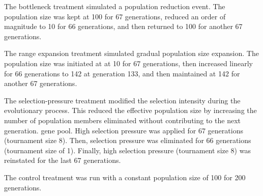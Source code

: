 The bottleneck treatment simulated a population reduction event.
The population size was kept at 100 for 67 generations, reduced an order of magnitude to 10 for 66 generations, and then returned to 100 for another 67 generations.

The range expansion treatment simulated gradual population size expansion.
The population size was initiated at at 10 for 67 generations, then increased linearly for 66 generations to 142 at generation 133, and then maintained at 142 for another 67 generations.

The selection-pressure treatment modified the selection intensity during the evolutionary process.
This reduced the effective population size by increasing the number of population members eliminated without contributing to the next generation. gene pool.
High selection pressure was applied for 67 generations (tournament size 8). Then, selection pressure was eliminated for 66 generations (tournament size of 1).
Finally, high selection pressure (tournament size 8) was reinstated for the last 67 generations.

The control treatment was run with a constant population size of 100 for 200 generations.
